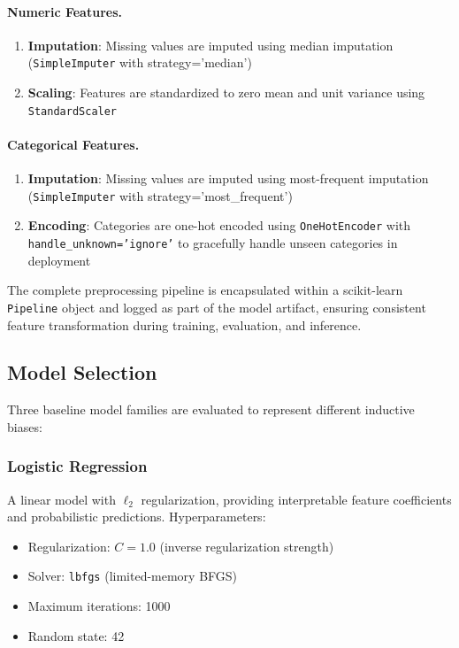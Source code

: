 \documentclass[11pt,a4paper]{article}
\begin{document}
\paragraph{Numeric Features.}
\begin{enumerate}
    \item \textbf{Imputation}: Missing values are imputed using median imputation (\texttt{SimpleImputer} with strategy='median')
    \item \textbf{Scaling}: Features are standardized to zero mean and unit variance using \texttt{StandardScaler}
\end{enumerate}

\paragraph{Categorical Features.}
\begin{enumerate}
    \item \textbf{Imputation}: Missing values are imputed using most-frequent imputation (\texttt{SimpleImputer} with strategy='most\_frequent')
    \item \textbf{Encoding}: Categories are one-hot encoded using \texttt{OneHotEncoder} with \texttt{handle\_unknown='ignore'} to gracefully handle unseen categories in deployment
\end{enumerate}

The complete preprocessing pipeline is encapsulated within a scikit-learn \texttt{Pipeline} object and logged as part of the model artifact, ensuring consistent feature transformation during training, evaluation, and inference.

\subsection{Model Selection}

Three baseline model families are evaluated to represent different inductive biases:

\subsubsection{Logistic Regression}

A linear model with $\ell_2$ regularization, providing interpretable feature coefficients and probabilistic predictions. Hyperparameters:
\begin{itemize}
    \item Regularization: $C = 1.0$ (inverse regularization strength)
    \item Solver: \texttt{lbfgs} (limited-memory BFGS)
    \item Maximum iterations: 1000
    \item Random state: 42
\end{itemize}
\end{document}
